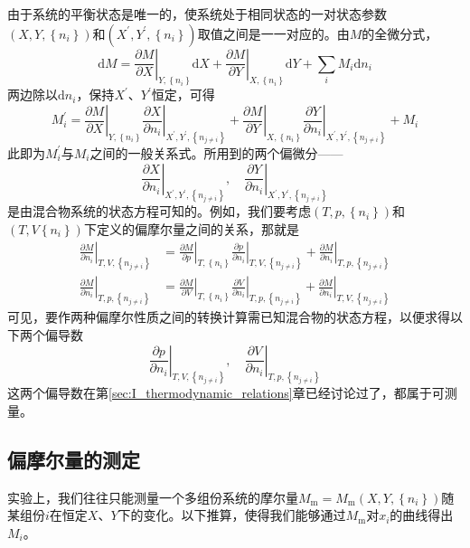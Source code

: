 \documentclass[main.tex]{subfiles}
\begin{document}
由于系统的平衡状态是唯一的，使系统处于相同状态的一对状态参数$\left(X,Y,\left\{n_i\right\}\right)$和$\left(X^\prime,Y^\prime,\left\{n_i\right\}\right)$取值之间是一一对应的。由$M$的全微分式，
\[\mathrm{d}M=\left.\frac{\partial M}{\partial X}\right|_{Y,\left\{n_i\right\}}\mathrm{d}X+\left.\frac{\partial M}{\partial Y}\right|_{X,\left\{n_i\right\}}\mathrm{d}Y+\sum_i M_i\mathrm{d}n_i\]
两边除以$\mathrm{d}n_i$，保持$X^\prime$、$Y^\prime$恒定，可得
\[M_i^\prime=\left.\frac{\partial M}{\partial X}\right|_{Y,\left\{n_i\right\}}\left.\frac{\partial X}{\partial n_i}\right|_{X^\prime,Y^\prime,\left\{n_{j\neq i}\right\}}+\left.\frac{\partial M}{\partial Y}\right|_{X,\left\{n_i\right\}}\left.\frac{\partial Y}{\partial n_i}\right|_{X^\prime,Y^\prime,\left\{n_{j\neq i}\right\}}+M_i\]
此即为$M_i^\prime$与$M_i$之间的一般关系式。所用到的两个偏微分——
\[\left.\frac{\partial X}{\partial n_i}\right|_{X^\prime,Y^\prime,\left\{n_{j\neq i}\right\}},\quad\left.\frac{\partial Y}{\partial n_i}\right|_{X^\prime,Y^\prime,\left\{n_{j\neq i}\right\}}\]
是由混合物系统的状态方程可知的。例如，我们要考虑$\left(T,p,\left\{n_i\right\}\right)$和$\left(T,V\left\{n_i\right\}\right)$下定义的偏摩尔量之间的关系，那就是
\begin{align*}
  \left.\frac{\partial M}{\partial n_i}\right|_{T,V,\left\{n_{j\neq i}\right\}} & =\left.\frac{\partial M}{\partial p}\right|_{T,\left\{n_i\right\}}\left.\frac{\partial p}{\partial n_i}\right|_{T,V,\left\{n_{j\neq i}\right\}}+\left.\frac{\partial M}{\partial n_i}\right|_{T,p,\left\{n_{j\neq i}\right\}} \\
  \left.\frac{\partial M}{\partial n_i}\right|_{T,p,\left\{n_{j\neq i}\right\}} & =\left.\frac{\partial M}{\partial V}\right|_{T,\left\{n_i\right\}}\left.\frac{\partial V}{\partial n_i}\right|_{T,p,\left\{n_{j\neq i}\right\}}+\left.\frac{\partial M}{\partial n_i}\right|_{T,V,\left\{n_{j\neq i}\right\}}
\end{align*}
可见，要作两种偏摩尔性质之间的转换计算需已知混合物的状态方程，以便求得以下两个偏导数
\[\left.\frac{\partial p}{\partial n_i}\right|_{T,V,\left\{n_{j\neq i}\right\}},\quad\left.\frac{\partial V}{\partial n_i}\right|_{T,p,\left\{n_{j\neq i}\right\}}\]
这两个偏导数在第\ref{sec:I_thermodynamic_relations}章已经讨论过了，都属于可测量。

\subsection{偏摩尔量的测定}
实验上，我们往往只能测量一个多组份系统的摩尔量$M_\text{m}=M_\text{m}\left(X,Y,\left\{n_i\right\}\right)$随某组份$i$在恒定$X$、$Y$下的变化。以下推算，使得我们能够通过$M_\text{m}$对$x_i$的曲线得出$M_i$。
\end{document}
